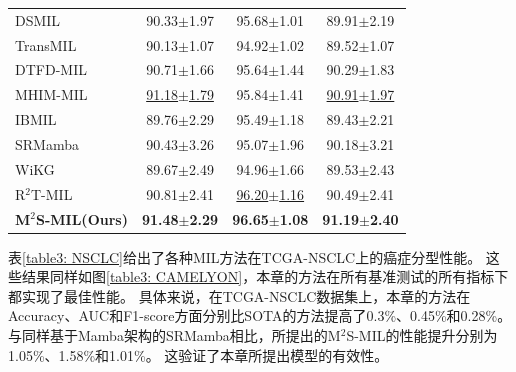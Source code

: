 {\begin{xltabular}{\textwidth}{XCCC}
  DSMIL~\cite{li2021dual}          & 90.33$\pm$1.97&95.68$\pm$1.01&89.91$\pm$2.19\\
  TransMIL~\cite{shao2021transmil} &  90.13$\pm$1.07&94.92$\pm$1.02&89.52$\pm$1.07\\
  DTFD-MIL~\cite{zhang2022dtfd}    &90.71$\pm$1.66&95.64$\pm$1.44&90.29$\pm$1.83\\
  MHIM-MIL~\cite{tang2023multiple}    & \underline{91.18$\pm$1.79}&95.84$\pm$1.41&\underline{90.91$\pm$1.97}\\
  IBMIL~\cite{lin2023interventional}    &89.76$\pm $2.29&95.49$\pm$1.18&89.43$\pm$2.21\\
  SRMamba~\cite{yang2024mambamil}&  90.43$\pm$3.26&95.07$\pm$1.96&90.18$\pm$3.21\\
  WiKG ~\cite{li2024dynamic}&  89.67$\pm$2.49&94.96$\pm$1.66&89.53$\pm$2.43\\
  R$^2$T-MIL ~\cite{tang2024feature}& 90.81$\pm$2.41& \underline{96.20$\pm$1.16}&90.49$\pm$2.41\\
   \textbf{M$^2$S-MIL(Ours)}&  \textbf{91.48$\pm$2.29}& \textbf{96.65$\pm$1.08}&\textbf{91.19$\pm$2.40}\\

\end{xltabular}}

表\ref{table3: NSCLC}给出了各种MIL方法在TCGA-NSCLC上的癌症分型性能。
这些结果同样如图\ref{table3: CAMELYON}，本章的方法在所有基准测试的所有指标下都实现了最佳性能。
具体来说，在TCGA-NSCLC数据集上，本章的方法在Accuracy、AUC和F1-score方面分别比SOTA的方法提高了0.3\%、0.45\%和0.28\%。
与同样基于Mamba架构的SRMamba相比，所提出的M$^2$S-MIL的性能提升分别为1.05\%、1.58\%和1.01\%。
这验证了本章所提出模型的有效性。

